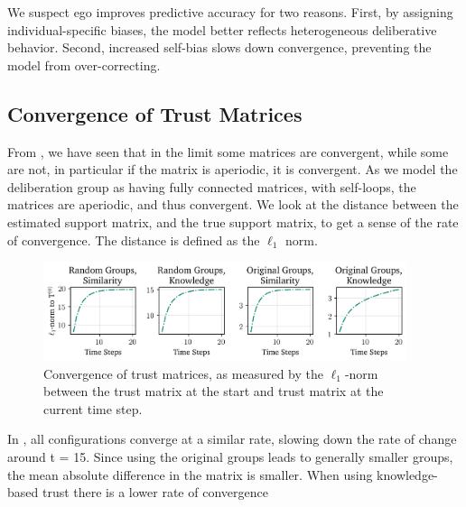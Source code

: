 We suspect ego improves predictive accuracy for two reasons. First, by
assigning individual-specific biases, the model better reflects heterogeneous
deliberative behavior. Second, increased self-bias slows down convergence,
preventing the model from over-correcting.

\subsection{Convergence of Trust Matrices}

From , we have seen that in the limit some matrices are
convergent, while some are not, in particular if the matrix is aperiodic, it
is convergent. As we model the deliberation group as having fully connected
matrices, with self-loops, the matrices are aperiodic, and thus convergent. We look at the
distance between the estimated support matrix, and the true support matrix, to
get a sense of the rate of convergence. The distance is defined as the
$\ell_1$ norm.

\begin{figure}[ht]
	\begin{center}
		\includegraphics[width=0.95\textwidth]{Figures/convergence_groups.png}
	\end{center}
	\caption{Convergence of trust matrices, as measured by the $\ell_1$-norm between the trust matrix at the start and  trust matrix at the current time step.}\label{fig:convergence_big}
\end{figure}

In , all configurations converge at a
similar rate, slowing down the rate of change around t = 15. Since using the
original groups leads to generally smaller groups, the mean absolute difference in
the matrix is smaller. When using knowledge-based trust there is a lower rate
of convergence




